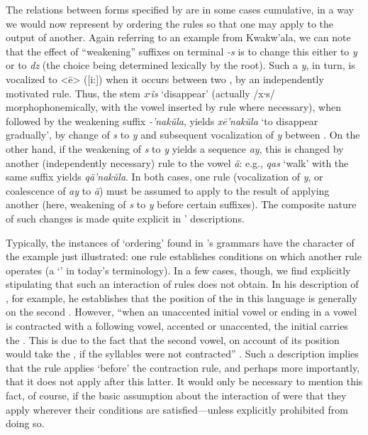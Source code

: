 The relations between forms specified by  are in some
cases cumulative, in a way we would now represent by ordering the
rules so that one may apply to the output of another. Again referring
to an example from Kwakw'ala, we can note that the effect of
``weakening'' suffixes on terminal \emph{-s} is to change this either to
\emph{y} or to \emph{dz} (the choice being determined lexically by the
root). Such a \emph{y}, in turn, is vocalized to <ē> ([i:]) when it
occurs between two , by an independently motivated
rule. Thus, the stem \emph{x∙îs} `disappear' (actually /x∙s/
morphophonemically, with the vowel inserted by rule where necessary),
when followed by the weakening suffix \emph{-'nakŭla}, yields
\emph{xē'nakŭla} `to disappear gradually', by change of \emph{s} to
\emph{y} and subsequent vocalization of \emph{y} between
. On the other hand, if the weakening of \emph{s} to
\emph{y} yields a sequence \emph{ay}, this is changed by another
(independently necessary) rule to the vowel \emph{ä}: e.g., \emph{qas}
`walk' with the same suffix yields \emph{qä'nakŭla}. In both cases,
one rule (vocalization of \emph{y}, or coalescence of \emph{ay} to
\emph{ä}) must be assumed to apply to the result of applying another
(here, weakening of \emph{s} to \emph{y} before certain suffixes). The
composite nature of such changes is made quite explicit in {\Boas}'
descriptions.

Typically, the instances of `ordering' found in {\Boas}'s grammars have
the character of the example just illustrated: one rule establishes
conditions on which another rule operates (a `' in
today's terminology). In a few cases, though, we find {\Boas} explicitly
stipulating that such an interaction of rules does not obtain. In his
description of , for example, he establishes that the position
of the  in this language is generally on the second
. However, ``when an unaccented initial vowel or 
ending in a vowel is contracted with a following vowel, accented or
unaccented, the initial  carries the . This is due to
the fact that the second vowel, on account of its position would take
the , if the syllables were not contracted''
\citep[21]{boas.deloria39:dakota}. Such a description implies that
the  rule applies `before' the contraction rule, and perhaps
more importantly, that it does not apply after this latter. It would
only be necessary to mention this fact, of course, if the basic
assumption about the interaction of  were that they apply
wherever their conditions are satisfied—unless explicitly prohibited
from doing so.


